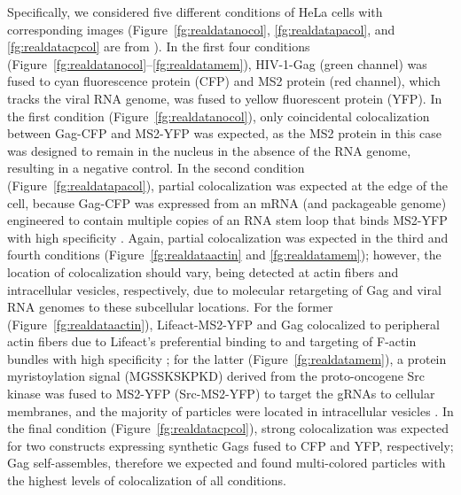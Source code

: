 \documentclass[10pt,twocolumn,twoside]{IEEEtran}
\begin{document}
Specifically, we considered five different conditions of HeLa cells with corresponding images (Figure~\ref{fg:realdatanocol}, \ref{fg:realdatapacol}, and \ref{fg:realdatacpcol} are from \cite{wang2017}). In the first four conditions (Figure~\ref{fg:realdatanocol}--\ref{fg:realdatamem}), HIV-1-Gag (green channel) was fused to cyan fluorescence protein (CFP) and MS2 protein (red channel), which tracks the viral RNA genome, was fused to yellow fluorescent protein (YFP). In the first condition (Figure~\ref{fg:realdatanocol}), only coincidental colocalization between Gag-CFP and MS2-YFP was expected, as the MS2 protein in this case was designed to remain in the nucleus in the absence of the RNA genome, resulting in a negative control. In the second condition (Figure~\ref{fg:realdatapacol}), partial colocalization was expected at the edge of the cell, because Gag-CFP was expressed from an mRNA (and packageable genome) engineered to contain multiple copies of an RNA stem loop that binds MS2-YFP with high specificity \citep[see][]{becker2017}. Again, partial colocalization was expected in the third and fourth conditions (Figure~\ref{fg:realdataactin} and \ref{fg:realdatamem}); however, the location of colocalization should vary, being detected at actin fibers and intracellular vesicles, respectively, due to molecular retargeting of Gag and viral RNA genomes to these subcellular locations.  For the former (Figure~\ref{fg:realdataactin}), Lifeact-MS2-YFP and Gag colocalized to peripheral actin fibers \citep[see][]{becker2017} due to Lifeact's preferential binding to and targeting of F-actin bundles with high specificity \citep[see][]{riedl2008}; for the latter (Figure~\ref{fg:realdatamem}), a protein myristoylation signal (MGSSKSKPKD) derived from the proto-oncogene Src kinase was fused to MS2-YFP (Src-MS2-YFP) to target the gRNAs to cellular membranes, and the majority of particles were located in intracellular vesicles \citep[see][]{becker2017}. In the final condition (Figure~\ref{fg:realdatacpcol}), strong colocalization was expected for two constructs expressing synthetic Gags fused to CFP and YFP, respectively; Gag self-assembles, therefore we expected and found multi-colored particles with the highest levels of colocalization of all conditions.
\end{document}
